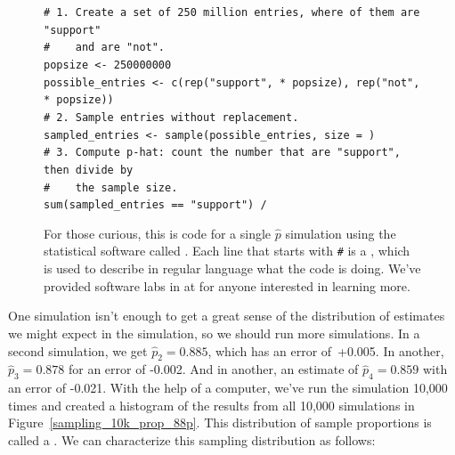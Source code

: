 \begin{figure}[h]
\texttt{\# 1.\ Create a set of 250 million entries,
where \pewsolarparpercent{} of them are "support" \\
\#\ \ \ \ and \pewsolarparpercentcomplement{} are "not". \\
pop\us{}size <- 250000000 \\
possible\_entries <- c(rep("support", \pewsolarparprop{} * pop\us{}size), rep("not", \pewsolarparpropcomplement{} * pop\us{}size))
\\[3mm]
\# 2.\ Sample \pewsolarpollsize{} entries without replacement. \\
sampled\_entries <- sample(possible\_entries, size = \pewsolarpollsize{}) \\[3mm]
\# 3.\ Compute p-hat:~count the number that are "support",
then divide by \\
\#\ \ \ \ the sample size. \\
sum(sampled\_entries == "support") / \pewsolarpollsize{}}
\caption{For those curious, this is code for
    a single $\hat{p}$ simulation using the
    statistical software called \R{}.
    Each line that starts with \texttt{\#} is a
    ,
    which is used to describe in regular language what the
    code is doing. We've provided software labs in \R{} at
    for anyone interested in learning more.}
\label{solarPollSimulationCodeR}
\end{figure}

One simulation isn't enough to get a great sense of the
distribution of estimates we might expect in the simulation,
so we should run more simulations.
In a second simulation,
we get $\hat{p}_2 = 0.885$, which has an error of~+0.005.
In another, $\hat{p}_3 = 0.878$ for an error of -0.002.
And in another,
an estimate of $\hat{p}_4 = 0.859$ with an error of -0.021.
With the help of a computer, we've run the simulation 10,000 times
and created a histogram of the results from all 10,000 simulations
in Figure~\ref{sampling_10k_prop_88p}. This
distribution of sample proportions is called a
.
We can characterize this sampling distribution as follows:

\D{\newpage}

